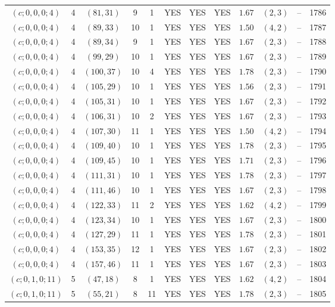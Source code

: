 \begin{longtable}{|c|c|c|c|c|c|c|c|c|c|c|c|}
$(c;0,0,0;4)$ & 4 & $(81,31)$ & 9 & 1 & YES & YES & YES & $1.67$ & $(2,3)$ & -- & 1786\\
$(c;0,0,0;4)$ & 4 & $(89,33)$ & 10 & 1 & YES & YES & YES & $1.50$ & $(4,2)$ & -- & 1787\\
$(c;0,0,0;4)$ & 4 & $(89,34)$ & 9 & 1 & YES & YES & YES & $1.67$ & $(2,3)$ & -- & 1788\\
$(c;0,0,0;4)$ & 4 & $(99,29)$ & 10 & 1 & YES & YES & YES & $1.67$ & $(2,3)$ & -- & 1789\\
$(c;0,0,0;4)$ & 4 & $(100,37)$ & 10 & 4 & YES & YES & YES & $1.78$ & $(2,3)$ & -- & 1790\\
$(c;0,0,0;4)$ & 4 & $(105,29)$ & 10 & 1 & YES & YES & YES & $1.56$ & $(2,3)$ & -- & 1791\\
$(c;0,0,0;4)$ & 4 & $(105,31)$ & 10 & 1 & YES & YES & YES & $1.67$ & $(2,3)$ & -- & 1792\\
$(c;0,0,0;4)$ & 4 & $(106,31)$ & 10 & 2 & YES & YES & YES & $1.67$ & $(2,3)$ & -- & 1793\\
$(c;0,0,0;4)$ & 4 & $(107,30)$ & 11 & 1 & YES & YES & YES & $1.50$ & $(4,2)$ & -- & 1794\\
$(c;0,0,0;4)$ & 4 & $(109,40)$ & 10 & 1 & YES & YES & YES & $1.78$ & $(2,3)$ & -- & 1795\\
$(c;0,0,0;4)$ & 4 & $(109,45)$ & 10 & 1 & YES & YES & YES & $1.71$ & $(2,3)$ & -- & 1796\\
$(c;0,0,0;4)$ & 4 & $(111,31)$ & 10 & 1 & YES & YES & YES & $1.78$ & $(2,3)$ & -- & 1797\\
$(c;0,0,0;4)$ & 4 & $(111,46)$ & 10 & 1 & YES & YES & YES & $1.67$ & $(2,3)$ & -- & 1798\\
$(c;0,0,0;4)$ & 4 & $(122,33)$ & 11 & 2 & YES & YES & YES & $1.62$ & $(4,2)$ & -- & 1799\\
$(c;0,0,0;4)$ & 4 & $(123,34)$ & 10 & 1 & YES & YES & YES & $1.67$ & $(2,3)$ & -- & 1800\\
$(c;0,0,0;4)$ & 4 & $(127,29)$ & 11 & 1 & YES & YES & YES & $1.78$ & $(2,3)$ & -- & 1801\\
$(c;0,0,0;4)$ & 4 & $(153,35)$ & 12 & 1 & YES & YES & YES & $1.67$ & $(2,3)$ & -- & 1802\\
$(c;0,0,0;4)$ & 4 & $(157,46)$ & 11 & 1 & YES & YES & YES & $1.67$ & $(2,3)$ & -- & 1803\\
$(c;0,1,0;11)$ & 5 & $(47,18)$ & 8 & 1 & YES & YES & YES & $1.62$ & $(4,2)$ & -- & 1804\\
$(c;0,1,0;11)$ & 5 & $(55,21)$ & 8 & 11 & YES & YES & YES & $1.78$ & $(2,3)$ & -- & 1805\\

\end{longtable}
